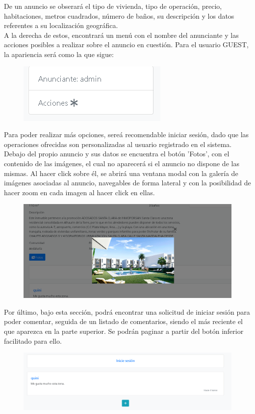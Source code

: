 De un anuncio se obserar\'{a} el tipo de vivienda, tipo de operaci\'{o}n, precio, habitaciones, metros cuadrados, n\'{u}mero de ba\~{n}os, su descripci\'{o}n y los datos referentes a su localizaci\'{o}n geogr\'{a}fica.\\

A la derecha de estos, encontrar\'{a} un men\'{u} con el nombre del anunciante y las acciones posibles a realizar sobre el anuncio en cuesti\'{o}n. Para el usuario GUEST, la apariencia ser\'{a} como la que sigue:

\begin{figure}[h!]
\centering
\includegraphics[width=.3\textwidth]{Img/ManualUsuario/LAGERAL_AD_GUEST.png}
\end{figure}

Para poder realizar m\'{a}s opciones, sere\'{a} recomendable iniciar sesi\'{o}n, dado que las operaciones ofrecidas son personalizadas al usuario registrado en el sistema.\\

Debajo del propio anuncio y sus datos se encuentra el bot\'{o}n 'Fotos', con el contenido de las im\'{a}genes, el cual no aparecer\'{a} si el anuncio no dispone de las mismas. Al hacer click sobre \'{e}l, se abrir\'{a} una ventana modal con la galer\'{i}a de im\'{a}genes asociadas al anuncio, navegables de forma lateral y con la posibilidad de hacer zoom en cada imagen al hacer click en ellas.

\begin{figure}[h!]
\centering
\includegraphics[width=.7\textwidth]{Img/ManualUsuario/GALERIA_GUEST.png}
\end{figure}

Por \'{u}ltimo, bajo esta secci\'{o}n, podr\'{a} encontrar una solicitud de iniciar sesi\'{o}n para poder comentar, seguida de un listado de comentarios, siendo el m\'{a}s reciente el que aparezca en la parte superior. Se podr\'{a}n paginar a partir del bot\'{o}n inferior facilitado para ello.

\begin{figure}[h!]
\centering
\includegraphics[width=.7\textwidth]{Img/ManualUsuario/COMENTARIOS_GUEST.png}
\end{figure}